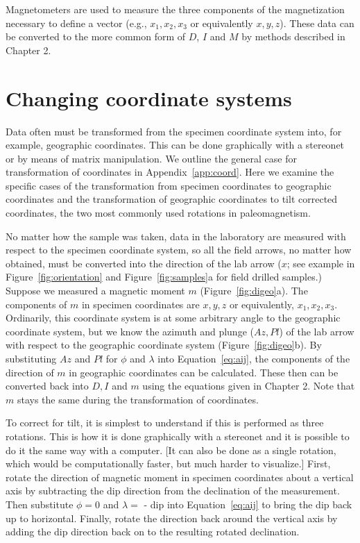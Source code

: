 Magnetometers are used to
 measure the three components of the magnetization necessary to
define a vector (e.g., $x_1,x_2,x_3$ or equivalently $x,y,z$).  These data 
can be converted to the more common form of
$D$, $I$ and $M$  by methods described in Chapter 2. 




\section {Changing coordinate systems}


Data often must be transformed from the specimen coordinate system into, 
%
for example, geographic coordinates.  This can be done graphically
with a stereonet or by means of matrix manipulation.  We outline the general case for transformation of coordinates in Appendix~\ref{app:coord}.  Here we examine the specific cases of the transformation from specimen coordinates to geographic coordinates and the transformation of geographic coordinates to tilt corrected coordinates, the two most commonly used rotations in paleomagnetism.  

No matter how the sample was taken,  data in the laboratory are measured with respect to the specimen coordinate system, so all the field arrows, no matter how obtained, must be converted into the direction of the lab arrow ($x $; see example in  Figure~\ref{fig:orientation} and Figure~\ref{fig:samples}a for field drilled samples.)      Suppose we measured a magnetic moment $m$ (Figure~\ref{fig:digeo}a).  The components of $m$ in specimen coordinates are $x, y, z$ or equivalently, $x_1, x_2, x_3$.   Ordinarily, this coordinate system is at some arbitrary angle to the geographic coordinate system, but we know the azimuth and plunge ($Az, Pl$) of the lab arrow with respect to the geographic coordinate system (Figure~\ref{fig:digeo}b).   By substituting $Az$ and $Pl$ for $\phi$ and $\lambda$ into Equation~\ref{eq:aij}, the components of the direction of $m$ in geographic coordinates can be calculated.  These then can be converted back into $D, I$ and $m$ using the equations given in Chapter 2.  Note that $m$ stays the same during the transformation of coordinates.  

To correct for tilt, it is simplest to understand if this is performed as three rotations.  This is how it is done graphically with a stereonet and it is possible to do it the same way with a computer.  [It can also be done as a single rotation, which would be computationally faster, but much harder to visualize.]    First, rotate the direction of magnetic moment in specimen coordinates about a vertical axis by subtracting the dip direction from the declination of the measurement.   Then substitute $\phi=0$ and $\lambda=$ - dip into Equation~\ref{eq:aij} to bring the dip back up to horizontal.  Finally, rotate the direction  back around the vertical axis by adding the dip direction back  on to the resulting rotated declination.   

